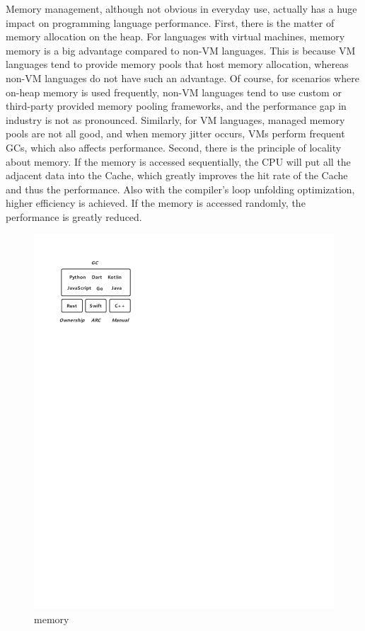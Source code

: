 Memory management, although not obvious in everyday use, actually has a huge impact on programming language performance. First, there is the matter of memory allocation on the heap. For languages with virtual machines, memory memory is a big advantage compared to non-VM languages. This is because VM languages tend to provide memory pools that host memory allocation, whereas non-VM languages do not have such an advantage. Of course, for scenarios where on-heap memory is used frequently, non-VM languages tend to use custom or third-party provided memory pooling frameworks, and the performance gap in industry is not as pronounced. Similarly, for VM languages, managed memory pools are not all good, and when memory jitter occurs, VMs perform frequent GCs, which also affects performance. Second, there is the principle of locality about memory. If the memory is accessed sequentially, the CPU will put all the adjacent data into the Cache, which greatly improves the hit rate of the Cache and thus the performance. Also with the compiler's loop unfolding optimization, higher efficiency is achieved. If the memory is accessed randomly, the performance is greatly reduced.

\begin{figure}[htbp]
    \centerline{\includegraphics[scale=0.8]{figures/memory}}
    \caption{memory}
    \label{fig:memory}
\end{figure}

